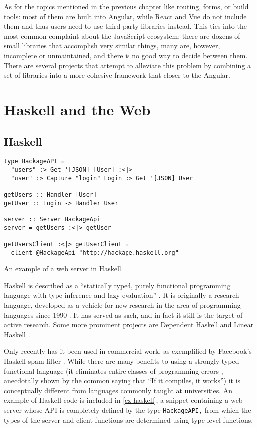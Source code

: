 \documentclass[english,odsaz]{fitthesis}
\begin{document}
As for the topics mentioned in the previous chapter like routing, forms, or
build tools: most of them are built into Angular, while React and Vue do not
include them and thus users need to use third-party libraries instead. This ties
into the most common complaint about the JavaScript ecosystem: there are dozens
of small libraries that accomplish very similar things, many are, however,
incomplete or unmaintained, and there is no good way to decide between
them. There are several projects that attempt to alleviate this problem by
combining a set of libraries into a more cohesive framework that closer to the
Angular.

\chapter{Haskell and the Web}
\label{sec:orgac8b321}
\section{Haskell}
\label{sec:orgd2e15ad}
\begin{listing}[htbp]
\begin{verbatim}
type HackageAPI =
  "users" :> Get '[JSON] [User] :<|>
  "user" :> Capture "login" Login :> Get '[JSON] User

getUsers :: Handler [User]
getUser :: Login -> Handler User

server :: Server HackageApi
server = getUsers :<|> getUser

getUsersClient :<|> getUserClient =
  client @HackageApi "http://hackage.haskell.org"
\end{verbatim}
\caption{An example of a web server in Haskell \label{ex-haskell}}
\end{listing}

Haskell is described as a ``statically typed, purely functional programming
language with type inference and lazy evaluation'' \cite{jones2003haskell}. It is
originally a research language, developed as a vehicle for new research in the
area of programming languages since 1990 \cite{haskell_history}. It has served as
such, and in fact it still is the target of active research. Some more prominent
projects are Dependent Haskell \cite{eisenberg2016dependent} and Linear Haskell
\cite{bernardy2017linear}.

Only recently has it been used in commercial work, as exemplified by Facebook's
Haskell spam filter \cite{marlow2015fighting}. While there are many benefits to
using a strongly typed functional language (it eliminates entire classes of
programming errors \cite{Nanz_2015}, anecdotally shown by the common saying that
``If it compiles, it works'') it is conceptually different from languages commonly
taught at universities. An example of Haskell code is included in
\ref{ex-haskell}, a snippet containing a web server whose API is completely
defined by the type \texttt{HackageAPI,} from which the types of the server and client
functions are determined using type-level functions.
\end{document}
